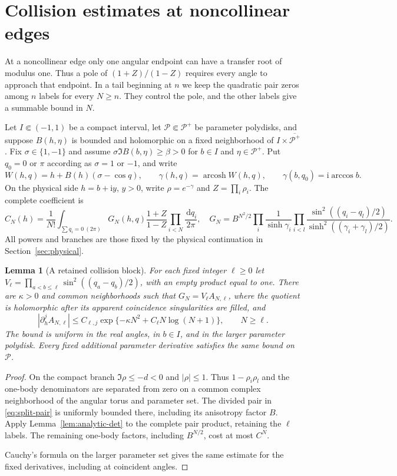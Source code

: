 \documentclass[11pt]{article}
\numberwithin{equation}{section}
\newtheorem{lemma}[theorem]{Lemma}
\theoremstyle{definition}
\newcommand{\ii}{\mathrm i}
\newcommand{\dd}{\,\mathrm d}
\begin{document}
\section{Collision estimates at noncollinear edges}
\label{edge:new:section}

At a noncollinear edge only one angular endpoint can have a transfer
root of modulus one. Thus a pole of $(1+Z)/(1-Z)$ requires every
angle to approach that endpoint. In a tail beginning at $n$ we keep
the quadratic pair zeros among $n$ labels for every $N\ge n$.
They control the pole, and the other labels give a summable bound in $N$.

Let $I\Subset(-1,1)$ be a compact interval, let
$\mathcal P\Subset\mathcal P^+$ be parameter polydisks, and suppose
$B(h,\eta)$ is bounded and holomorphic on a fixed neighborhood of
$I\times\overline{\mathcal P^+}$.  Fix $\sigma\in\{1,-1\}$ and assume
$\sigma\Im B(b,\eta)\ge\beta>0$ for $b\in I$ and
$\eta\in\mathcal P^+$.  Put $q_0=0$ or $\pi$ according as
$\sigma=1$ or $-1$, and write
\[
 W(h,q)=h+B(h)(\sigma-\cos q),\qquad
 \gamma(h,q)=\operatorname{arcosh}W(h,q),\qquad
 \gamma(b,q_0)=\ii\arccos b.
\]
On the physical side $h=b+\ii y$, $y>0$, write $\rho=e^{-\gamma}$ and
$Z=\prod_i\rho_i$.  The complete coefficient is
\[
 C_N(h)=\frac1{N!}\int_{\sum q_i=0\ (2\pi)}G_N(h,q)
              \frac{1+Z}{1-Z}\prod_{i<N}\frac{\dd q_i}{2\pi},
\quad
 G_N=B^{N^2/2}\prod_i\frac1{\sinh\gamma_i}
       \prod_{i<l}\frac{\sin^2((q_i-q_l)/2)}
       {\sinh^2((\gamma_i+\gamma_l)/2)}.
\]
All powers and branches are those fixed by the physical continuation
in Section~\ref{sec:physical}.

\begin{lemma}[A retained collision block]\label{edge:new:gaussian}
For each fixed integer $\ell\ge0$ let
$V_\ell=\prod_{a<b\le\ell}\sin^2((q_a-q_b)/2)$, with an empty
product equal to one.  There are $\kappa>0$ and common neighborhoods
such that $G_N=V_\ell A_{N,\ell}$, where the quotient is holomorphic
after its apparent coincidence singularities are filled, and
\[
 |\partial_h^j A_{N,\ell}|
 \le C_{\ell,j}\exp\{-\kappa N^2+C_\ell N\log(N+1)\},
 \qquad N\ge\ell.
\]
The bound is uniform in the real angles, in $b\in I$, and in the
larger parameter polydisk.  Every fixed additional parameter derivative
satisfies the same bound on $\mathcal P$.
\end{lemma}
\begin{proof}
On the compact branch $\Im\rho\le-d<0$ and $|\rho|\le1$.
Thus $1-\rho_i\rho_l$ and the one-body denominators are separated
from zero on a common complex neighborhood of the angular torus
and parameter set. The divided pair in \eqref{eq:split-pair} is uniformly bounded
there, including its anisotropy factor $B$. Apply
Lemma~\ref{lem:analytic-det} to the complete pair product, retaining
the $\ell$ labels. The remaining one-body factors, including
$B^{N/2}$, cost at most $C^N$.

Cauchy's formula on the larger parameter set gives the same estimate
for the fixed derivatives, including at coincident angles.
\end{proof}
\end{document}
